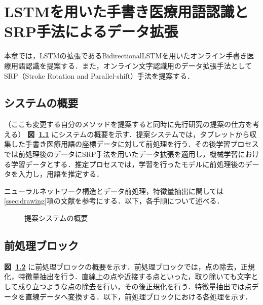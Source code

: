 
\chapter{LSTMを用いた手書き医療用語認識とSRP手法によるデータ拡張}
\label{cha:propose}
本章では，LSTMの拡張であるBidirectionalLSTMを用いたオンライン手書き医療用語認識を提案する．また，オンライン文字認識用のデータ拡張手法としてSRP（Stroke Rotation and Parallel-shift）手法を提案する．
\section{システムの概要}
\label{sec:concept}
（ここも変更する自分のメソッドを提案すると同時に先行研究の提案の仕方を考える）
\textbf{図~\ref{sys_concept}} にシステムの概要を示す．提案システムでは，タブレットから収集した手書き医療用語の座標データに対して前処理を行う．その後学習プロセスでは前処理後のデータにSRP手法を用いたデータ拡張を適用し，機械学習における学習データとする．推定プロセスでは，学習を行ったモデルに前処理後のデータを入力し，用語を推定する．

ニューラルネットワーク構造とデータ前処理，特徴量抽出に関しては\ref{ssec:drawing}項の文献\cite{zhang18:drawing}を参考にする．以下，各手順について述べる．

\begin{figure}[tb]
 \begin{center}
  \caption{提案システムの概要}
  \label{sys_concept}
\end{center}
\end{figure}

\section{前処理ブロック}
\label{preprocess}
\textbf{図~\ref{preprocess}} に前処理ブロックの概要を示す．前処理ブロックでは，点の除去，正規化，特徴量抽出を行う．直線上の点や近接する点といった，取り除いても文字として成り立つような点の除去を行い，その後正規化を行う．特徴量抽出では点データを直線データへ変換する．以下，前処理ブロックにおける各処理を示す．

